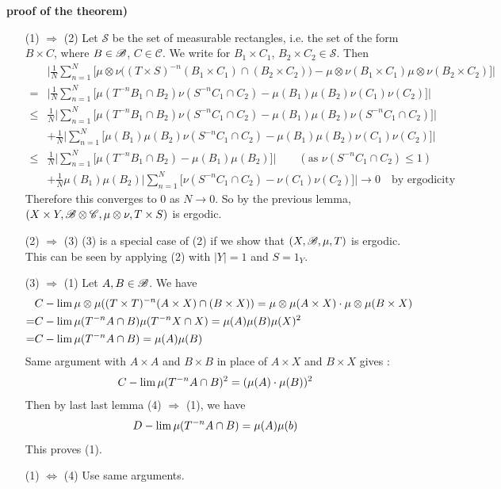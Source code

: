 \documentclass[12pt,a4paper]{report}
\newenvironment{proof}
{\begin{changemargin}{1cm}{0.5cm} 
	}%
	{\end{changemargin}
}
\begin{document}
\begin{proof}
\textbf{proof of the theorem)}
\begin{itemize}
\item[(1) $\Rightarrow$ (2)] Let $\mathscr{S}$ be the set of measurable rectangles, i.e. the set of the form $B\times C$, where $B\in \mathscr{B}$, $C\in \mathscr{C}$. We write for $B_1 \times C_1$, $B_2\times C_2 \in \mathscr{S}$. Then
\begin{align*}
& \Big| \frac{1}{N}\sum_{n=1}^N \Big[ \mu \otimes \nu \big((T\times S)^{-n}(B_1 \times C_1) \cap (B_2 \times C_2) \big) - \mu \otimes \nu (B_1 \times C_1)\mu \otimes \nu (B_2 \times C_2) \Big] \Big| \\
=& \Big| \frac{1}{N} \sum_{n=1}^N \Big[ \mu(T^{-n}B_1 \cap B_2) \nu(S^{-n}C_1 \cap C_2) - \mu(B_1) \mu(B_2) \nu(C_1) \nu(C_2) \Big] \Big| \\
\leq & \frac{1}{N} \Big| \sum_{n=1}^N \Big[ \mu(T^{-n}B_1 \cap B_2) \nu(S^{-n}C_1 \cap C_2) - \mu(B_1)\mu(B_2)\nu(S^{-n}C_1\cap C_2) \Big] \Big| \\
& + \frac{1}{N} \Big| \sum_{n=1}^N \Big[ \mu(B_1)\mu(B_2)\nu(S^{-n}C_1\cap C_2) - \mu(B_1) \mu(B_2) \nu(C_1) \nu(C_2) \Big] \Big| \\
\leq & \frac{1}{N} \Big| \sum_{n=1}^N \Big[ \mu(T^{-n}B_1 \cap B_2) - \mu(B_1)\mu(B_2)\Big] \Big| \quad\quad (\text{as } \nu(S^{-n}C_1\cap C_2) \leq 1 ) \\
& + \frac{1}{N} \mu(B_1) \mu(B_2) \Big| \sum_{n=1}^N \Big[ \nu(S^{-n}C_1 \cap C_2) - \nu(C_1)\nu(C_2) \Big] \Big| \rightarrow 0 \quad \text{by ergodicity}
\end{align*}
Therefore this converges to 0 as $N\rightarrow 0$. So by the previous lemma, $(X\times Y,\mathscr{B}\otimes \mathscr{C}, \mu\otimes \nu, T\times S)$ is ergodic.
\item[(2) $\Rightarrow$ (3)] (3) is a special case of (2) if we show that $(X,\mathscr{B}, \mu, T)$ is ergodic. This can be seen by applying (2) with $|Y|=1$ and $S = 1_{Y}$.
\item[(3) $\Rightarrow$ (1)]  Let $A,B \in \mathscr{B}$. We have
\begin{align*}
& C-\lim \mu \otimes \mu((T\times T)^{-n}(A\times X) \cap (B\times X)) = \mu \otimes \mu (A \times X) \cdot \mu \otimes \mu (B \times X) \\
=& C-\lim \mu(T^{-n}A\cap B)\mu(T^{-n}X\cap X) = \mu(A) \mu(B) \mu(X)^2 \\
=& C-\lim \mu(T^{-n}A\cap B) = \mu(A) \mu(B)
\end{align*}
Same argument with $A \times A$ and $B\times B$ in place of $A\times X$ and $B\times X$ gives :
\begin{align*}
C-\lim \mu(T^{-n}A \cap B)^2 = (\mu(A) \cdot \mu(B))^2
\end{align*}
Then by last last lemma (4) $\Rightarrow$ (1), we have
\begin{align*}
D-\lim \mu(T^{-n} A\cap B)= \mu(A) \mu(b)
\end{align*}
This proves (1).
\item[(1) $\Leftrightarrow$ (4)] Use same arguments.
\end{itemize}
\end{proof}
\s
\end{document}
